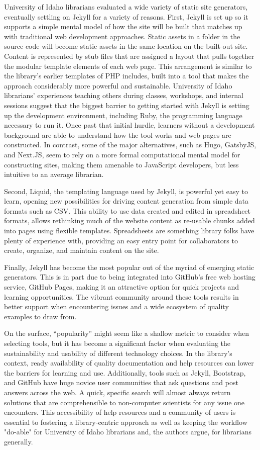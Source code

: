 \documentclass{book}
\begin{document}
University of Idaho librarians evaluated a wide variety of static site
generators, eventually settling on Jekyll for a variety of reasons. First,
Jekyll is set up so it supports a simple mental model of how the site will be
built that matches up with traditional web development approaches. Static
assets in a folder in the source code will become static assets in the same
location on the built-out site. Content is represented by stub files that are
assigned a layout that pulls together the modular template elements of each
web page. This arrangement is similar to the library's earlier templates of
PHP includes, built into a tool that makes the approach considerably more
powerful and sustainable. University of Idaho librarians' experiences teaching
others during classes, workshops, and internal sessions suggest that the
biggest barrier to getting started with Jekyll is setting up the development
environment, including Ruby, the programming language necessary to run it.
Once past that initial hurdle, learners without a development background are
able to understand how the tool works and web pages are constructed. In
contrast, some of the major alternatives, such as Hugo, GatsbyJS, and Next.JS,
seem to rely on a more formal computational mental model for constructing
sites, making them amenable to JavaScript developers, but less intuitive to an
average librarian.

Second, Liquid, the templating language used by Jekyll, is powerful yet easy
to learn, opening new possibilities for driving content generation from simple
data formats such as CSV. This ability to use data created and edited in
spreadsheet formats, allows rethinking much of the website content as
re-usable chunks added into pages using flexible templates. Spreadsheets are
something library folks have plenty of experience with, providing an easy
entry point for collaborators to create, organize, and maintain content on the
site.

Finally, Jekyll has become the most popular out of the myriad of emerging
static generators. This is in part due to being integrated into GitHub's free
web hosting service, GitHub Pages, making it an attractive option for quick
projects and learning opportunities. The vibrant community around these tools
results in better support when encountering issues and a wide ecosystem of
quality examples to draw from.

On the surface, ``popularity'' might seem like a shallow metric to consider
when selecting tools, but it has become a significant factor when evaluating
the sustainability and usability of different technology choices. In the
library's context, ready availability of quality documentation and help
resources can lower the barriers for learning and use. Additionally, tools
such as Jekyll, Bootstrap, and GitHub have huge novice user communities that
ask questions and post answers across the web. A quick, specific search will
almost always return solutions that are comprehensible to non-computer
scientists for any issue one encounters. This accessibility of help resources
and a community of users is essential to fostering a library-centric approach
as well as keeping the workflow "do-able" for University of Idaho librarians
and, the authors argue, for librarians generally.
\end{document}
